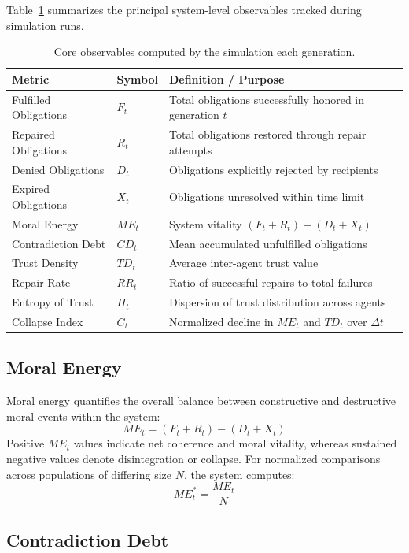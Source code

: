 \documentclass[11pt]{article}
\begin{document}
Table~\ref{tab:metrics} summarizes the principal system-level observables tracked during simulation runs.

\begin{table}[H]
\centering
\begin{tabular}{@{}lll@{}}
\toprule
\textbf{Metric} & \textbf{Symbol} & \textbf{Definition / Purpose} \\
\midrule
Fulfilled Obligations & $F_t$ & Total obligations successfully honored in generation $t$ \\
Repaired Obligations & $R_t$ & Total obligations restored through repair attempts \\
Denied Obligations & $D_t$ & Obligations explicitly rejected by recipients \\
Expired Obligations & $X_t$ & Obligations unresolved within time limit \\
Moral Energy & $ME_t$ & System vitality $(F_t + R_t) - (D_t + X_t)$ \\
Contradiction Debt & $CD_t$ & Mean accumulated unfulfilled obligations \\
Trust Density & $TD_t$ & Average inter-agent trust value \\
Repair Rate & $RR_t$ & Ratio of successful repairs to total failures \\
Entropy of Trust & $H_t$ & Dispersion of trust distribution across agents \\
Collapse Index & $C_t$ & Normalized decline in $ME_t$ and $TD_t$ over $\Delta t$ \\
\bottomrule
\end{tabular}
\caption{Core observables computed by the simulation each generation.}
\label{tab:metrics}
\end{table}

\subsection{Moral Energy}

Moral energy quantifies the overall balance between constructive and destructive moral events within the system:
\[
ME_t = (F_t + R_t) - (D_t + X_t)
\]
Positive $ME_t$ values indicate net coherence and moral vitality, whereas sustained negative values denote disintegration or collapse.  
For normalized comparisons across populations of differing size $N$, the system computes:
\[
ME_t^* = \frac{ME_t}{N}
\]

\subsection{Contradiction Debt}
\end{document}
